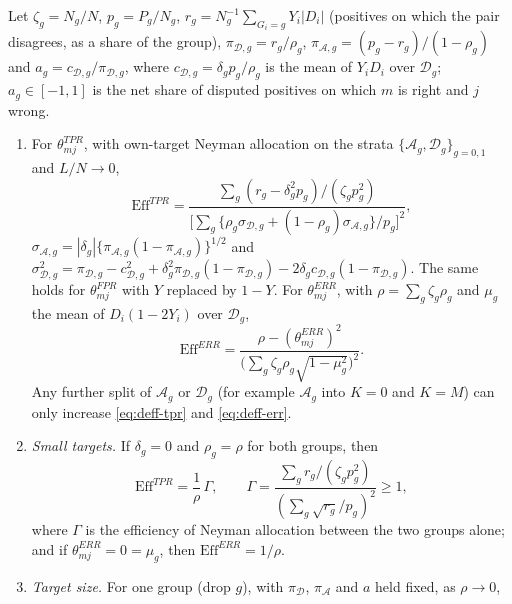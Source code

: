 \begin{corollary}\label{prop:deff}
Let $\zeta_g=N_g/N$, $p_g=P_g/N_g$, $r_g=N_g^{-1}\sum_{G_i=g}Y_i|D_i|$ (positives on which the pair
disagrees, as a share of the group), $\pi_{\mathcal D,g}=r_g/\rho_g$,
$\pi_{\mathcal A,g}=(p_g-r_g)/(1-\rho_g)$ and $a_g=c_{\mathcal D,g}/\pi_{\mathcal D,g}$, where
$c_{\mathcal D,g}=\delta_gp_g/\rho_g$ is the mean of $Y_iD_i$ over $\mathcal D_g$; $a_g\in[-1,1]$
is the net share of disputed positives on which $m$ is right and $j$ wrong.
\begin{enumerate}
\item[(a)] For $\theta^{TPR}_{mj}$, with own-target Neyman allocation on the strata
$\{\mathcal A_g,\mathcal D_g\}_{g=0,1}$ and $L/N\to0$,
\begin{equation}\label{eq:deff-tpr}
\mathrm{Eff}^{TPR}=\frac{\sum_g(r_g-\delta_g^2p_g)/(\zeta_gp_g^2)}
{\big[\sum_g\{\rho_g\sigma_{\mathcal D,g}+(1-\rho_g)\sigma_{\mathcal A,g}\}/p_g\big]^2},
\end{equation}
$\sigma_{\mathcal A,g}=|\delta_g|\{\pi_{\mathcal A,g}(1-\pi_{\mathcal A,g})\}^{1/2}$ and $\sigma^2_{\mathcal D,g}=\pi_{\mathcal D,g}-c_{\mathcal D,g}^2+\delta_g^2\pi_{\mathcal D,g}(1-\pi_{\mathcal D,g})
-2\delta_gc_{\mathcal D,g}(1-\pi_{\mathcal D,g})$. The same holds for $\theta^{FPR}_{mj}$ with $Y$
replaced by $1-Y$. For $\theta^{ERR}_{mj}$, with $\rho=\sum_g\zeta_g\rho_g$ and $\mu_g$ the mean of
$D_i(1-2Y_i)$ over $\mathcal D_g$,
\begin{equation}\label{eq:deff-err}
\mathrm{Eff}^{ERR}=\frac{\rho-(\theta^{ERR}_{mj})^2}{\big(\sum_g\zeta_g\rho_g\sqrt{1-\mu_g^2}\big)^2}.
\end{equation}
Any further split of $\mathcal A_g$ or $\mathcal D_g$ (for example $\mathcal A_g$ into $K=0$ and
$K=M$) can only increase \eqref{eq:deff-tpr} and \eqref{eq:deff-err}.
\item[(b)] \emph{Small targets.} If $\delta_g=0$ and $\rho_g=\rho$ for both groups, then
\begin{equation}\label{eq:deff-small}
\mathrm{Eff}^{TPR}=\frac1\rho\,\Gamma,\qquad
\Gamma=\frac{\sum_gr_g/(\zeta_gp_g^2)}{(\sum_g\sqrt{r_g}/p_g)^2}\ge1,
\end{equation}
where $\Gamma$ is the efficiency of Neyman allocation between the two groups alone; and if
$\theta^{ERR}_{mj}=0=\mu_g$, then $\mathrm{Eff}^{ERR}=1/\rho$.
\item[(c)] \emph{Target size.} For one group (drop $g$), with $\pi_{\mathcal D}$,
$\pi_{\mathcal A}$ and $a$ held fixed, as $\rho\to0$,

\end{enumerate}
\end{corollary}
